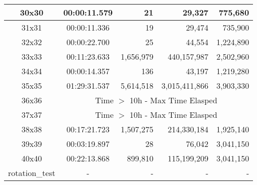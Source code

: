 \begin{center}
\begin{tabular}{|c|c|r|r|r|}
		30x30 & 00:00:11.579 & 21 & 29,327 & 775,680 \\ \hline
		31x31 & 00:00:11.336 & 19 & 29,474 & 735,900 \\ \hline
		32x32 & 00:00:22.700 & 25 & 44,554 & 1,224,890 \\ \hline
		33x33 & 00:11:23.633 & 1,656,979 & 440,157,987 & 2,502,960 \\ \hline
		34x34 & 00:00:14.357 & 136 & 43,197 & 1,219,280 \\ \hline
		35x35 & 01:29:31.537 & 5,614,518 & 3,015,411,866 & 3,903,330 \\ \hline
		36x36 & \multicolumn{4}{|c|}{Time $>$ 10h - Max Time Elasped} \\ \hline
		37x37 & \multicolumn{4}{|c|}{Time $>$ 10h - Max Time Elasped} \\ \hline
		38x38 & 00:17:21.723 & 1,507,275 & 214,330,184 & 1,925,140 \\ \hline
		39x39 & 00:03:19.897 & 28 & 76,042 & 3,041,150 \\ \hline
		40x40 & 00:22:13.868 & 899,810 & 115,199,209 & 3,041,150 \\ \hline
		rotation\_test & - & - & - & - \\ \hline

    \end{tabular}
\end{center}
